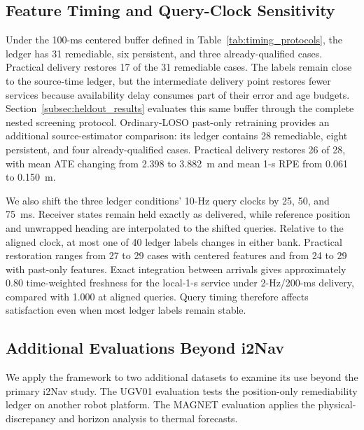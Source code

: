 \documentclass[journal]{IEEEtran}
\newcommand{\rev}[1]{#1}
\newcommand{\newrev}[1]{{#1}}
\begin{document}
\subsection{\rev{Feature Timing and Query-Clock Sensitivity}}
\label{subsec:feature_timing_results}

\newrev{Under the 100-ms centered buffer defined in
Table~\ref{tab:timing_protocols}, the ledger has 31 remediable,
six persistent, and three already-qualified cases. Practical delivery
restores 17 of the 31 remediable cases. The labels remain close to the
source-time ledger, but the intermediate delivery point restores fewer
services because availability delay consumes part of their error and age
budgets. Section~\ref{subsec:heldout_results} evaluates this same buffer
through the complete nested screening protocol. Ordinary-LOSO past-only
retraining provides an additional source-estimator comparison: its ledger
contains 28 remediable, eight persistent, and four already-qualified cases.
Practical delivery restores 26 of 28, with mean ATE changing from 2.398 to 3.882~m
and mean 1-s RPE from 0.061 to 0.150~m.}

\rev{We also shift the three ledger conditions' 10-Hz query clocks by
25, 50, and 75~ms. Receiver states remain held exactly as delivered,
while reference position and unwrapped heading are interpolated to the
shifted queries. Relative to the aligned clock, at most one of 40 ledger
labels changes in either bank. Practical restoration ranges from 27 to
29 cases with centered features and from 24 to 29 with past-only
features. Exact integration between arrivals gives approximately 0.80
time-weighted freshness for the local-1-s service under 2-Hz/200-ms
delivery, compared with 1.000 at aligned queries. Query timing therefore
affects satisfaction even when most ledger labels remain stable.}

\subsection{Additional Evaluations Beyond i2Nav}
\label{subsec:beyond_i2nav}

We apply the framework to two additional datasets to examine its use
beyond the primary i2Nav study. The UGV01 evaluation tests the
position-only remediability ledger on another robot platform. The MAGNET
evaluation applies the physical-discrepancy and horizon analysis to
thermal forecasts.
\end{document}
